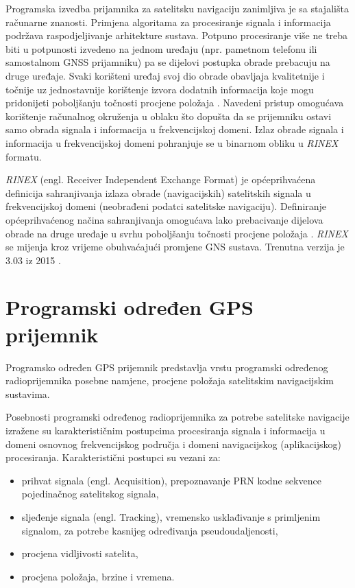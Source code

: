 \documentclass[a4paper,twoside,12pt]{memoir} %
\begin{document}
Programska izvedba prijamnika za satelitsku navigaciju zanimljiva je sa stajališta računarne
znanosti. Primjena algoritama za procesiranje signala i informacija podržava raspodjeljivanje
arhitekture sustava. Potpuno procesiranje više ne treba biti u potpunosti izvedeno na jednom uređaju
(npr. pametnom telefonu ili samostalnom GNSS prijamniku) pa se dijelovi postupka obrade prebacuju na druge uređaje. Svaki korišteni uređaj svoj dio obrade obavljaja kvalitetnije i točnije uz jednostavnije
korištenje izvora dodatnih informacija koje mogu pridonijeti poboljšanju točnosti procjene
položaja \cite{ref:46,ref:47}. Navedeni pristup omogućava korištenje računalnog okruženja u
oblaku što dopušta da se prijemniku ostavi samo obrada signala i informacija u frekvencijskoj
domeni. Izlaz obrade signala i informacija u frekvencijskoj domeni pohranjuje se u binarnom obliku
u \textit{RINEX} formatu.

\textit{RINEX}\label{sssec:rinex}
(engl. Receiver Independent Exchange Format) je općeprihvaćena definicija
sahranjivanja izlaza obrade (navigacijskih) satelitskih signala u frekvencijskoj domeni (neobrađeni podatci satelitske navigaciju).
Definiranje općeprihvaćenog načina sahranjivanja omogućava lako prebacivanje dijelova obrade 
na druge uređaje u svrhu poboljšanju točnosti procjene
položaja \cite{ref:46,ref:47}.
\textit{RINEX} se mijenja kroz vrijeme obuhvaćajući promjene GNS sustava. Trenutna verzija je
3.03 iz 2015 \cite{rinex:303}.

\section{Programski određen GPS prijemnik}
Programsko određen GPS prijemnik predstavlja vrstu programski određenog radioprijemnika posebne namjene,  procjene položaja satelitskim navigacijskim sustavima.

Posebnosti programski određenog radioprijemnika za potrebe
satelitske navigacije izražene su karakterističnim postupcima procesiranja signala i informacija u
domeni osnovnog frekvencijskog područja i domeni navigacijskog (aplikacijskog) procesiranja.
Karakteristični postupci su vezani za:
\begin{itemize}
	\item prihvat signala (engl. Acquisition), prepoznavanje PRN kodne sekvence pojedinačnog
	satelitskog signala,
	\item sljeđenje signala (engl. Tracking), vremensko usklađivanje s primljenim signalom, za
	potrebe kasnijeg određivanja pseudoudaljenosti,
	\item procjena vidljivosti satelita,
	\item procjena položaja, brzine i vremena.
\end{itemize}
\end{document}
